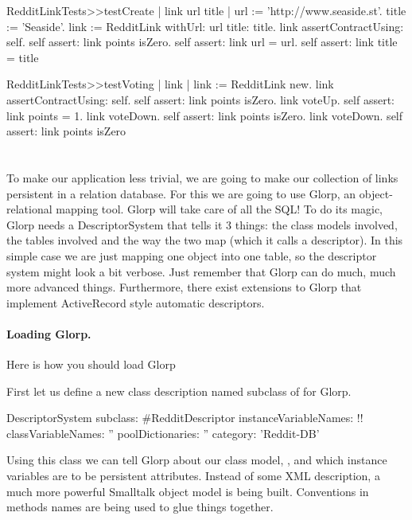 \documentclass[a4paper,10pt,twoside]{book}
\begin{document}
\begin{code}{}
RedditLinkTests>>testCreate
    | link url title | 
    url := 'http://www.seaside.st'. 
    title := 'Seaside'. 
    link := RedditLink withUrl: url title: title. 
    link assertContractUsing: self. 
    self assert: link points isZero. 
    self assert: link url = url. 
    self assert: link title = title
\end{code}

\begin{code}{}
RedditLinkTests>>testVoting
    | link | 
    link := RedditLink new. 
    link assertContractUsing: self. 
    self assert: link points isZero. link voteUp. 
    self assert: link points = 1. 
    link voteDown. self assert: 
    link points isZero. 
    link voteDown. 
    self assert: link points isZero
\end{code}


\section{}

To make our application less trivial, we are going to make our collection of links persistent in a relation database. For this we are going to use Glorp, an object-relational mapping tool. Glorp will take care of all the SQL! To do its magic, Glorp needs a DescriptorSystem that tells it 3 things: the class models involved, the tables involved and the way the two map (which it calls a descriptor). In this simple case we are just mapping one object into one table, so the descriptor system might look a bit verbose. Just remember that Glorp can do much, much more advanced things. Furthermore, there exist extensions to Glorp that implement ActiveRecord style automatic descriptors.

\paragraph{Loading Glorp.}
Here is how you should load Glorp 


First let us define a new class description named  subclass of   for Glorp.

\begin{code}{}
DescriptorSystem subclass: #RedditDescriptor
   instanceVariableNames: !! 
   classVariableNames: '' 
   poolDictionaries: '' 
   category: 'Reddit-DB'
\end{code}


Using this class we can tell Glorp about our class model, , and which instance variables are to be persistent attributes. Instead of some XML description, a much more powerful Smalltalk object model is being built. Conventions in methods names are being used to glue things together.
\end{document}
